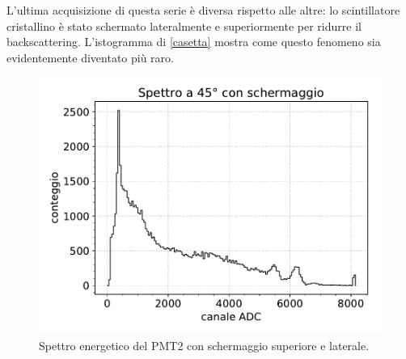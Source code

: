 L'ultima acquisizione di questa serie è diversa rispetto alle altre: lo scintillatore cristallino è stato schermato lateralmente e superiormente per ridurre il backscattering. L'istogramma di \autoref{casetta} mostra come questo fenomeno sia evidentemente diventato più raro.

\begin{figure}
\centering
\includegraphics[width=25 em]{45gs}
\caption{Spettro energetico del PMT2 con schermaggio superiore e laterale.}
\label{casetta}
\end{figure}
